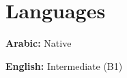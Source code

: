 \documentclass[letterpaper,11pt]{article}
\begin{document}
\section{Languages}
\begin{itemize}[leftmargin=0.15in, label={}]
  \small{
    \item \textbf{Arabic:} Native
    \item \textbf{English:} Intermediate (B1)
  }
\end{itemize}
\end{document}
